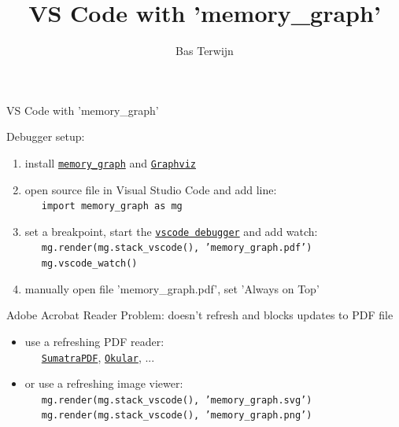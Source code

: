 \documentclass[10pt, colorlinks=true, urlcolor=blue]{beamer}
\title{VS Code with 'memory\_graph'}
\author{Bas Terwijn}
\date{}
\begin{document}
\begin{frame}
    \titlepage
\end{frame}

\begin{frame}{VS Code with 'memory\_graph'}

  Debugger setup:
  \begin{enumerate}
  \item install \href{https://pypi.org/project/memory-graph/}{\texttt{memory\_graph}} and \href{https://graphviz.org/download/}{\texttt{Graphviz}}
  \item open source file in Visual Studio Code and add line: \\
    \ \ \ {\footnotesize \texttt{import memory_graph as mg}}
  \item set a breakpoint, start the \href{https://code.visualstudio.com/docs/python/debugging}{\texttt{vscode debugger}} and add watch: \\
    \ \ \ {\footnotesize \texttt{mg.render(mg.stack_vscode(), 'memory_graph.pdf')}} \\
    \ \ \ {\footnotesize \texttt{mg.vscode_watch()}}
  \item manually open file 'memory\_graph.pdf',  set 'Always on Top'
  \end{enumerate}
  
  \vspace{1.8em}
  
  Adobe Acrobat Reader Problem: doesn't refresh and blocks updates to PDF file
  \begin{itemize}
  \item use a refreshing PDF reader: \\ \ \ \
    \href{https://www.sumatrapdfreader.org/}{\texttt{SumatraPDF}},
    \href{https://okular.kde.org/}{\texttt{Okular}}, ...
  \item or use a refreshing image viewer: \\
\ \ \ {\footnotesize \texttt{mg.render(mg.stack_vscode(), 'memory_graph.svg')}} \\
\ \ \ {\footnotesize \texttt{mg.render(mg.stack_vscode(), 'memory_graph.png')}}
  \end{itemize}
\end{frame}
\end{document}
